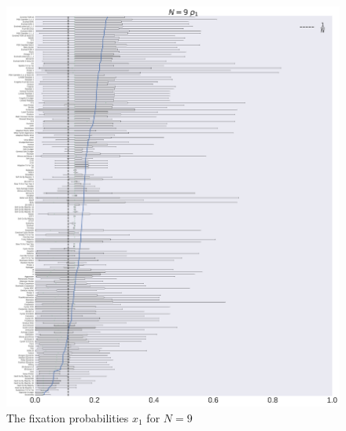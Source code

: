 \documentclass[10pt,letterpaper]{article}
\begin{document}
\begin{figure}[!hbtp]
    \centering
    \includegraphics[width=\textwidth]{./boxplot_9_invade.pdf}
    \caption{The fixation probabilities \(x_1\) for \(N=9\)}
\end{figure}
\end{document}
